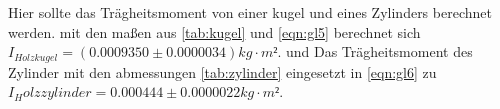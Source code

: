 Hier sollte das Trägheitsmoment von einer kugel und eines Zylinders berechnet werden. mit den maßen aus \autoref{tab:kugel}
und \autoref{eqn:gl5} berechnet sich $I_{Holzkugel} = (0.0009350\pm0.0000034)kg ⋅ m²$. und Das Trägheitsmoment des Zylinder
mit den abmessungen \autoref{tab:zylinder} eingesetzt in \autoref{eqn:gl6} zu $I_Holzzylinder = 
0.000444\pm0.0000022 kg ⋅ m²$.





